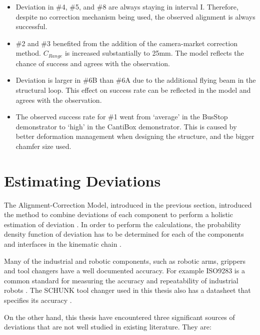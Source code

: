 \begin{itemize}
	\item Deviation in \#4, \#5, and \#8 are always staying in interval \textrm{I}. Therefore, despite no correction mechanism being used, the observed alignment is always successful.

	\item \#2 and \#3 benefited from the addition of the camera-market correction method. $C_{Range}$ is increased substantially to 25mm. The model reflects the chance of success and agrees with the observation.

	\item Deviation is larger in \#6B than \#6A due to the additional flying beam in the structural loop. This effect on success rate can be reflected in the model and agrees with the observation.

	\item The observed success rate for \#1 went from ‘average’ in the BusStop demonstrator to ‘high’ in the CantiBox demonstrator. This is caused by better deformation management when designing the structure, and the bigger chamfer size used.
\end{itemize}

\clearpage
\section{Estimating Deviations}
\label{section:estimating-deviations}

The Alignment-Correction Model, introduced in the previous section, introduced the method to combine deviations of each component to perform a holistic estimation of deviation . In order to perform the calculations, the probability density function of deviation has to be determined for each of the components and interfaces in the kinematic chain .

Many of the industrial and robotic components, such as robotic arms, grippers and tool changers have a well documented accuracy. For example ISO9283 is a common standard for measuring the accuracy and repeatability of industrial robots \parencite{iso9283:1998ManipulatingIndustrialRobots1998}. The SCHUNK tool changer used in this thesis also has a datasheet that specifies its accuracy \parencite{schunkgmbh&co.kgSWSCatalog2023}.

On the other hand, this thesis have encountered three significant sources of deviations that are not well studied in existing literature. They are:

